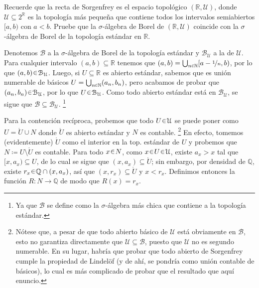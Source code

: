 \setcounter{neje}{26}
\begin{nejer}
Recuerde que la recta de Sorgenfrey es el espacio topológico $(\mathbb{R}, \mathcal{U})$, donde $\mathcal{U} \subseteq 2^\mathbb{R}$ es la topología más pequeña que contiene todos los intervalos semiabiertos $[a, b)$ con $a < b$. Pruebe que la $\sigma$-álgebra de Borel de $(\mathbb{R}, \mathcal{U})$ coincide con la $\sigma$-álgebra de Borel de la topología estándar en $\mathbb{R}$.
\end{nejer}
\begin{sol}
Denotemos $\mathcal{B}$ a la $\sigma$-álgebra de Borel de la topología estándar y $\mathcal{B}_\mathcal{U}$ a la de $\mathcal{U}$.
Para cualquier intervalo $(a,b) \subseteq \mathbb{R}$ tenemos que $(a,b) = \bigcup_{n\en\mathbb{N}} [a-\nicefrac{1}{n},b)$, por lo que $(a,b) \en \mathcal{B}_{\mathcal{U}}$. Luego, si $U\subseteq\mathbb{R}$ es abierto estándar, sabemos que es unión numerable de básicos $U = \bigcup_{n\en\mathbb{N}}(a_n,b_n)$, pero acabamos de probar que $(a_n,b_n) \en \mathcal{B}_\mathcal{U}$, por lo que $U\en\mathcal{B}_\mathcal{U}$. Como todo abierto estándar está en $\mathcal{B}_\mathcal{U}$, se sigue que $\mathcal{B} \subseteq \mathcal{B}_\mathcal{U}$.%
\footnote{
Ya que $\mathcal{B}$ se define como la $\sigma$-álgebra más chica que contiene a la topología estándar.
}\par
\medskip
Para la contención recíproca, probemos que todo $U\en\mathcal{U}$ se puede poner como $U = \mathring{U} \cup N$ donde $\mathring{U}$ es abierto estándar y $N$ es contable.%
\footnote{
    Nótese que, a pesar de que todo abierto básico de $\mathcal{U}$ está obviamente en $\mathcal{B}$, esto no garantiza directamente que $\mathcal{U}\subseteq \mathcal{B}$, puesto que $\mathcal{U}$ no es segundo numerable. En su lugar, habría que probar que todo abierto de Sorgenfrey cumple la propiedad de Lindelöf (y de ahí, se pondría como unión contable de básicos), lo cual es más complicado de probar que el resultado que aquí enuncio.
}
En efecto, tomemos (evidentemente) $\mathring{U}$ como el interior en la top. estándar de $U$ y probemos que $N \coloneq U \setminus\mathring{U}$ es contable. Para todo $x\en N$, como $x\en U\en\mathcal{U}$, existe $a_x>x$ tal que $[x,a_x) \subseteq U$, de lo cual se sigue que $(x,a_x) \subseteq \mathring{U}$; sin embargo, por densidad de $\mathbb{Q}$, existe $r_x\en \mathbb{Q} \cap (x,a_x)$, así que $(x,r_x) \subseteq \mathring{U}$ y $x<r_x$. Definimos entonces la función $R \colon N \to \mathbb{Q}$ de modo que $R(x) = r_x$.\par

\end{sol}
